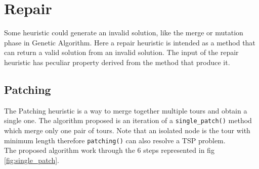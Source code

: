 \chapter{Repair}
Some heuristic could generate an invalid solution, like the merge or mutation phase in Genetic Algorithm. Here a repair heuristic is intended as a method that can return a valid solution from an invalid solution. The input of the repair heuristic has peculiar property derived from the method that produce it.
\section{Patching} \label{section:patching}
The Patching heuristic is a way to merge together multiple tours and obtain a single one.
The algorithm proposed is an iteration of a \texttt{single\_patch()} method which merge only one pair of tours. Note that an isolated node is the tour with minimum length therefore \texttt{patching()} can also resolve a TSP problem. \\
The proposed algorithm work through the 6 steps represented in fig \ref{fig:single_patch}.
